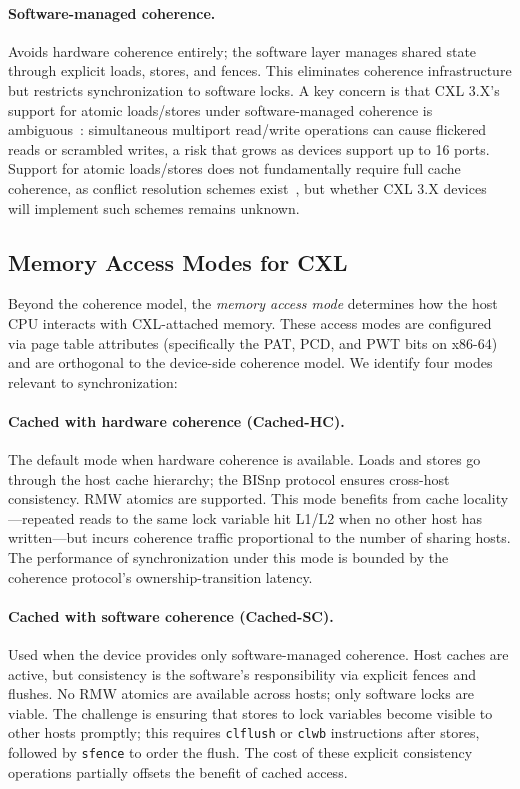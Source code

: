 \paragraph{Software-managed coherence.}
Avoids hardware coherence entirely; the software layer manages shared state through explicit loads, stores, and fences.
This eliminates coherence infrastructure but restricts synchronization to software locks.
A key concern is that CXL 3.X's support for atomic loads/stores under software-managed coherence is ambiguous~\cite{lamportMutualExclusionProblem,lamportMutualExclusionProblema}: simultaneous multiport read/write operations can cause flickered reads or scrambled writes, a risk that grows as devices support up to 16 ports.
Support for atomic loads/stores does not fundamentally require full cache coherence, as conflict resolution schemes exist~\cite{wangIntelligentMultiPortMemory2008}, but whether CXL 3.X devices will implement such schemes remains unknown.

\subsection{Memory Access Modes for CXL}
\label{sec:access-modes}

Beyond the coherence model, the \emph{memory access mode} determines how the host CPU interacts with CXL-attached memory.
These access modes are configured via page table attributes (specifically the PAT, PCD, and PWT bits on x86-64) and are orthogonal to the device-side coherence model.
We identify four modes relevant to synchronization:

\paragraph{Cached with hardware coherence (Cached-HC).}
The default mode when hardware coherence is available.
Loads and stores go through the host cache hierarchy; the BISnp protocol ensures cross-host consistency.
RMW atomics are supported.
This mode benefits from cache locality---repeated reads to the same lock variable hit L1/L2 when no other host has written---but incurs coherence traffic proportional to the number of sharing hosts.
The performance of synchronization under this mode is bounded by the coherence protocol's ownership-transition latency.

\paragraph{Cached with software coherence (Cached-SC).}
Used when the device provides only software-managed coherence.
Host caches are active, but consistency is the software's responsibility via explicit fences and flushes.
No RMW atomics are available across hosts; only software locks are viable.
The challenge is ensuring that stores to lock variables become visible to other hosts promptly; this requires \texttt{clflush} or \texttt{clwb} instructions after stores, followed by \texttt{sfence} to order the flush.
The cost of these explicit consistency operations partially offsets the benefit of cached access.


